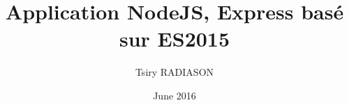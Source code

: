 \documentclass[a4paper,12pt]{book}
\begin{document}
\author{Tsiry RADIASON}
\title{Application NodeJS, Express basé sur ES2015}
\date{June 2016}

\frontmatter
\maketitle
\tableofcontents

\mainmatter

















\backmatter

\end{document}
